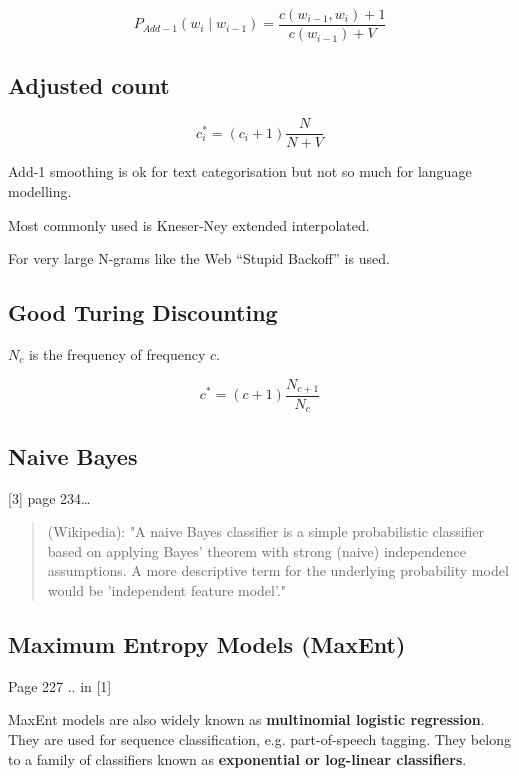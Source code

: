 \begin{equation}
  P_{Add-1}(w_i \mid w_{i-1}) = \frac{c(w_{i-1}, w_i) + 1}{c(w_{i-1}) + V}
  \label{eq:padd1}
\end{equation}


\subsection*{Adjusted count}

\begin{equation}
  c_i^* = (c_i+1)\frac{N}{N+V}
  \label{eq:ci}
\end{equation}

Add-1 smoothing is ok for text categorisation but not so much for language modelling.

Most commonly used is Kneser-Ney extended interpolated.

For very large N-grams like the Web “Stupid Backoff” is used.


\subsection*{Good Turing Discounting}

$N_c$ is the frequency of frequency $c$.

\begin{equation}
  c^* = (c+1)\frac{N_{c+1}}{N_c}
  \label{eq:cstar}
\end{equation}


\subsection*{Naive Bayes}

[3] page 234…

\begin{quote}
  (Wikipedia): "A naive Bayes classifier is a simple probabilistic classifier based on applying Bayes' theorem with strong (naive) independence assumptions. A more descriptive term for the underlying probability model would be 'independent feature model'."
\end{quote}


\subsection*{Maximum Entropy Models (MaxEnt)}

Page 227 .. in [1]

MaxEnt models are also widely known as \textbf{multinomial logistic regression}. They are used for sequence classification, e.g. part-of-speech tagging. They belong to a family of classifiers known as \textbf{exponential or log-linear classifiers}.

